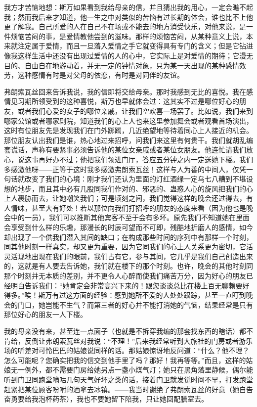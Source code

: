 \par 我方才苦恼地想：斯万如果看到我给母亲的信，并且猜出我的用心，一定会瞧不起我；然而我后来才知道，他一生之中对类似的苦恼有过长期的体会，谁也比不上他更了解我。自己所爱的人在自己不在场或不能去的地方消受快乐，对他来说，是一件烦恼苦闷的事，是爱情教他尝到的滋味。那样的烦恼苦闷，从某种意义上说，本来就注定属于爱情，而且一旦落入爱情之手它就变得具有专门的含义；但是它钻进像我这样生活中还没有出现过爱情的人的心中，它实际上是对爱情的期待；它漫无目的、自由自在地游动着，并无一定的钟情对象，只为某一天出现的某种感情效劳，这种感情有时是对父母的依恋，有时是对同伴的友谊。
\par 弗朗索瓦丝回来告诉我说，我的信即将交给母亲。那时我感到无比的喜悦。我在感情见习期所领受到的这种喜悦，斯万也早就体会过：这其实不过是哪位好心的朋友，或者我们心爱的女子的哪位亲戚，让我们空欢喜一场罢了。比如说，我们来到哪家公馆或者哪家剧院，知道我们的心上人也来这里参加舞会或者观看首场演出，这时有位朋友先是发现我们在门外踯躅，几近绝望地等待着同心上人接近的机会。那位朋友认出我们是谁，热心地过来招呼，问我们来这里有何贵干。我们就胡乱编套谎话，声称有要紧事必须告诉他的某位女亲戚或者某位女朋友。他连忙请我们放心，说这事再好办不过；他把我们领进门厅，答应五分钟之内一定送她下楼。我们多感激他呀——正等于这时我多感激弗朗索瓦丝！这样与人为善的中间人，仅凭一句话就改变了我们的心境：刚才我们还认为里面的灯红酒绿一定乌七八糟到不堪设想的地步，而且其中必有几股同我们作对的、邪恶的、蛊惑人心的旋风把我们的心上人裹胁而去，让她嘲笑我们；可是顷刻之间，我们觉得这样的晚会还过得去，有人情味，甚至大有好处！若以那位向我们打招呼的朋友的态度来看（因为他也是晚会中的一员），我们可以推断其他宾客不至于会有多坏。原先我们不知道她在里面会享受到什么样的乐趣，那漫长的时辰可望而不可即，残酷地折磨人的感情，如今却出现了一个供我们潜入其间的缺口；在构成那些时间的序列中有那样一个时刻，同其他时刻一样真实，却又更为重要，因为它同我们的心上人关系更为密切，它活灵活现地出现在我们的眼前，我们占有它，参与其间，它几乎是我们自己创造出来的，这就是有人要去告诉她，我们就在楼下的那个时刻。也许，晚会的其他时刻同那个时刻并无本质的差别，并不更令人心醉而使我们痛苦万分，因为好心的朋友已经明白告诉我们：“她肯定会非常高兴下来的！跟您谈谈总比在楼上百无聊赖要好得多。”唉！斯万有过这方面的经验：感到她所不爱的人处处跟踪，甚至一直盯到晚会的门口，她岂能不生气？而第三者的好心并不能打消她的气恼，结果经常是只有那位好心的朋友一人下楼。
\par 我的母亲没有来，甚至连一点面子（也就是不拆穿我编的那套找东西的瞎话）都不肯给，反倒让弗朗索瓦丝对我说：“不理！”后来我经常听到大旅社的门房或者游乐场的听差对可怜巴巴的姑娘说同样的话。那姑娘惊讶地反问道：“什么？他不理？怎么可能呢？您确实把我的信交到他手里了吗？那好！我再等等。”而且，这样的姑娘无一例外，都不需要门房给她另点一盏小煤气灯；她只在黑角落里静候，偶尔能听到门卫同跑堂嘀咕几句天气好坏之类的话，接着门卫就发觉时间不早，打发跑堂赶紧把某位顾客吩咐的酒拿去冰镇。——我当时谢绝了弗朗索瓦丝的好意（她自告奋勇要给我泡杯药茶），我也不要她留下陪我，只让她回配膳室去。

